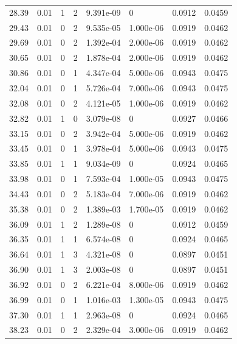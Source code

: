 \documentclass[preview]{standalone}
\begin{document}
{{{\begin{tabular}{L{1.2cm}C{1.2cm} C{0.3cm}C{0.5cm} C{1.4cm}C{1.4cm} C{1.4cm}C{1.4cm}}
  28.39  &  0.01  & 1     &  2 &  9.391e-09  & 0  & 0.0912 &  0.0459   \\ 
  29.43  &  0.01  & 0     &  2 &  9.535e-05  & 1.000e-06  & 0.0919 &  0.0462   \\ 
  29.69  &  0.01  & 0     &  2 &  1.392e-04  & 2.000e-06  & 0.0919 &  0.0462   \\ 
  30.65  &  0.01  & 0     &  2 &  1.878e-04  & 2.000e-06  & 0.0919 &  0.0462   \\ 
  30.86  &  0.01  & 0     &  1 &  4.347e-04  & 5.000e-06  & 0.0943 &  0.0475   \\ 
  32.04  &  0.01  & 0     &  1 &  5.726e-04  & 7.000e-06  & 0.0943 &  0.0475   \\ 
  32.08  &  0.01  & 0     &  2 &  4.121e-05  & 1.000e-06  & 0.0919 &  0.0462   \\ 
  32.82  &  0.01  & 1     &  0 &  3.079e-08  & 0  & 0.0927 &  0.0466   \\ 
  33.15  &  0.01  & 0     &  2 &  3.942e-04  & 5.000e-06  & 0.0919 &  0.0462   \\ 
  33.45  &  0.01  & 0     &  1 &  3.978e-04  & 5.000e-06  & 0.0943 &  0.0475   \\ 
  33.85  &  0.01  & 1     &  1 &  9.034e-09  & 0  & 0.0924 &  0.0465   \\ 
  33.98  &  0.01  & 0     &  1 &  7.593e-04  & 1.000e-05  & 0.0943 &  0.0475   \\ 
  34.43  &  0.01  & 0     &  2 &  5.183e-04  & 7.000e-06  & 0.0919 &  0.0462   \\ 
  35.38  &  0.01  & 0     &  2 &  1.389e-03  & 1.700e-05  & 0.0919 &  0.0462   \\ 
  36.09  &  0.01  & 1     &  2 &  1.289e-08  & 0  & 0.0912 &  0.0459   \\ 
  36.35  &  0.01  & 1     &  1 &  6.574e-08  & 0  & 0.0924 &  0.0465   \\ 
  36.64  &  0.01  & 1     &  3 &  4.321e-08  & 0  & 0.0897 &  0.0451   \\ 
  36.90  &  0.01  & 1     &  3 &  2.003e-08  & 0  & 0.0897 &  0.0451   \\ 
  36.92  &  0.01  & 0     &  2 &  6.221e-04  & 8.000e-06  & 0.0919 &  0.0462   \\ 
  36.99  &  0.01  & 0     &  1 &  1.016e-03  & 1.300e-05  & 0.0943 &  0.0475   \\ 
  37.30  &  0.01  & 1     &  1 &  2.963e-08  & 0  & 0.0924 &  0.0465   \\ 
  38.23  &  0.01  & 0     &  2 &  2.329e-04  & 3.000e-06  & 0.0919 &  0.0462   \\ 

\end{tabular}}}}
\end{document}

